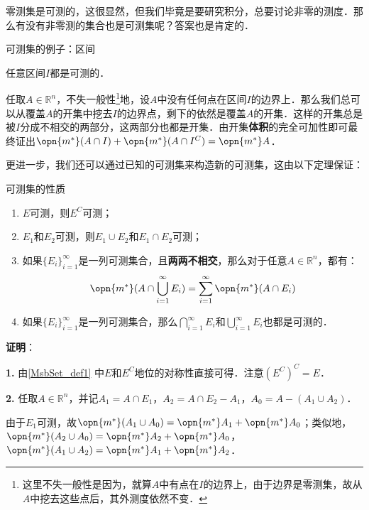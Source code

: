 零测集是可测的，这很显然，但我们毕竟是要研究积分，总要讨论非零的测度．那么有没有非零测的集合也是可测集呢？答案也是肯定的．

\begin{example}{可测集的例子：区间}\label{MsbSet_ex1}

任意区间$I$都是可测的．

任取$A\in\mathbb{R}^n$，不失一般性\footnote{这里不失一般性是因为，就算$A$中有点在$I$的边界上，由于边界是零测集，故从$A$中挖去这些点后，其外测度依然不变．}地，设$A$中没有任何点在区间$I$的边界上．那么我们总可以从覆盖$A$的开集中挖去$I$的边界点，剩下的依然是覆盖$A$的开集．这样的开集总是被$I$分成不相交的两部分，这两部分也都是开集．由开集\textbf{体积}的完全可加性即可最终证出$\opn{m^*}(A\cap I)+\opn{m^*}(A\cap I^C)=\opn{m^*}A$．

\end{example}

更进一步，我们还可以通过已知的可测集来构造新的可测集，这由以下定理保证：

\begin{theorem}{可测集的性质}

\begin{enumerate}
\item $E$可测，则$E^C$可测；
\item $E_1$和$E_2$可测，则$E_1\cup E_2$和$E_1\cap E_2$可测；
\item 如果$\{E_i\}_{i=1}^{\infty}$是一列可测集合，且\textbf{两两不相交}，那么对于任意$A\in\mathbb{R}^n$，都有：
\begin{equation}\label{MsbSet_eq4}
\opn{m^*}(A\cap \bigcup_{i=1}^{\infty}E_i)=\sum_{i=1}^{\infty}\opn{m^*}(A\cap E_i)
\end{equation}
\item 如果$\{E_i\}_{i=1}^{\infty}$是一列可测集合，那么$\bigcap_{i=1}^{\infty}E_i$和$\bigcup_{i=1}^{\infty}E_i$也都是可测的．
\end{enumerate}

\end{theorem}

\textbf{证明}：


\textbf{1.} 由\autoref{MsbSet_def1} 中$E$和$E^C$地位的对称性直接可得．注意$(E^C)^C=E$．

\textbf{2.} 任取$A\in\mathbb{R}^n$，并记$A_1=A\cap E_1$，$A_2=A\cap E_2-A_1$，$A_0=A-(A_1\cup A_2)$．


由于$E_1$可测，故$\opn{m^*}(A_1\cup A_0)=\opn{m^*}A_1+\opn{m^*}A_0$；类似地，$\opn{m^*}(A_2\cup A_0)=\opn{m^*}A_2+\opn{m^*}A_0$，$\opn{m^*}(A_1\cup A_2)=\opn{m^*}A_1+\opn{m^*}A_2$．

